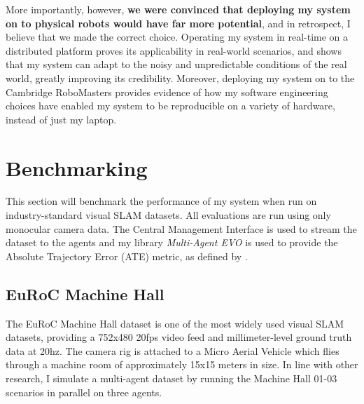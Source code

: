 
More importantly, however, \textbf{we were convinced that deploying my system on to physical robots would have far more potential}, and in retrospect, I believe that we made the correct choice. Operating my system in real-time on a distributed platform proves its applicability in real-world scenarios, and shows that my system can adapt to the noisy and unpredictable conditions of the real world, greatly improving its credibility. Moreover, deploying my system on to the Cambridge RoboMasters provides evidence of how my software engineering choices have enabled my system to be reproducible on a variety of hardware, instead of just my laptop.

\section{Benchmarking}
\label{sec:benchmarking}
This section will benchmark the performance of my system when run on industry-standard visual SLAM datasets. All evaluations are run using only monocular camera data. The Central Management Interface is used to stream the dataset to the agents and my library \textit{Multi-Agent EVO} is used to provide the Absolute Trajectory Error (ATE) metric, as defined by \autocite{6385773}.

\subsection{EuRoC Machine Hall}
\label{sec:euroc-machine-hall}
The EuRoC Machine Hall dataset \autocite{burri2016euroc} is one of the most widely used visual SLAM datasets, providing a 752x480 20fps video feed and millimeter-level ground truth data at 20hz. The camera rig is attached to a Micro Aerial Vehicle which flies through a machine room of approximately 15x15 meters in size. In line with other research, I simulate a multi-agent dataset by running the Machine Hall 01-03 scenarios in parallel on three agents.

